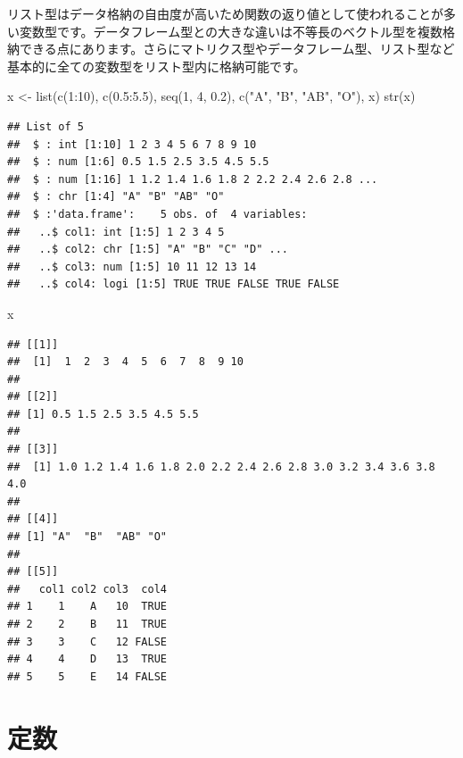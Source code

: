 \documentclass[
  12pt,
]{book}
\newenvironment{Shaded}{\begin{snugshade}}{\end{snugshade}}
\newcommand{\DecValTok}[1]{\textcolor[rgb]{0.00,0.00,0.81}{#1}}
\newcommand{\FloatTok}[1]{\textcolor[rgb]{0.00,0.00,0.81}{#1}}
\newcommand{\FunctionTok}[1]{\textcolor[rgb]{0.00,0.00,0.00}{#1}}
\newcommand{\NormalTok}[1]{#1}
\newcommand{\OtherTok}[1]{\textcolor[rgb]{0.56,0.35,0.01}{#1}}
\newcommand{\SpecialCharTok}[1]{\textcolor[rgb]{0.00,0.00,0.00}{#1}}
\newcommand{\StringTok}[1]{\textcolor[rgb]{0.31,0.60,0.02}{#1}}
\begin{document}
リスト型はデータ格納の自由度が高いため関数の返り値として使われることが多い変数型です。データフレーム型との大きな違いは不等長のベクトル型を複数格納できる点にあります。さらにマトリクス型やデータフレーム型、リスト型など基本的に全ての変数型をリスト型内に格納可能です。

\begin{Shaded}
\begin{Highlighting}[]
\NormalTok{x }\OtherTok{\textless{}{-}} \FunctionTok{list}\NormalTok{(}\FunctionTok{c}\NormalTok{(}\DecValTok{1}\SpecialCharTok{:}\DecValTok{10}\NormalTok{), }\FunctionTok{c}\NormalTok{(}\FloatTok{0.5}\SpecialCharTok{:}\FloatTok{5.5}\NormalTok{), }\FunctionTok{seq}\NormalTok{(}\DecValTok{1}\NormalTok{, }\DecValTok{4}\NormalTok{, }\FloatTok{0.2}\NormalTok{), }\FunctionTok{c}\NormalTok{(}\StringTok{"A"}\NormalTok{, }\StringTok{"B"}\NormalTok{, }\StringTok{"AB"}\NormalTok{, }\StringTok{"O"}\NormalTok{), x)}
\FunctionTok{str}\NormalTok{(x)}
\end{Highlighting}
\end{Shaded}

\begin{verbatim}
## List of 5
##  $ : int [1:10] 1 2 3 4 5 6 7 8 9 10
##  $ : num [1:6] 0.5 1.5 2.5 3.5 4.5 5.5
##  $ : num [1:16] 1 1.2 1.4 1.6 1.8 2 2.2 2.4 2.6 2.8 ...
##  $ : chr [1:4] "A" "B" "AB" "O"
##  $ :'data.frame':    5 obs. of  4 variables:
##   ..$ col1: int [1:5] 1 2 3 4 5
##   ..$ col2: chr [1:5] "A" "B" "C" "D" ...
##   ..$ col3: num [1:5] 10 11 12 13 14
##   ..$ col4: logi [1:5] TRUE TRUE FALSE TRUE FALSE
\end{verbatim}

\begin{Shaded}
\begin{Highlighting}[]
\NormalTok{x}
\end{Highlighting}
\end{Shaded}

\begin{verbatim}
## [[1]]
##  [1]  1  2  3  4  5  6  7  8  9 10
## 
## [[2]]
## [1] 0.5 1.5 2.5 3.5 4.5 5.5
## 
## [[3]]
##  [1] 1.0 1.2 1.4 1.6 1.8 2.0 2.2 2.4 2.6 2.8 3.0 3.2 3.4 3.6 3.8 4.0
## 
## [[4]]
## [1] "A"  "B"  "AB" "O" 
## 
## [[5]]
##   col1 col2 col3  col4
## 1    1    A   10  TRUE
## 2    2    B   11  TRUE
## 3    3    C   12 FALSE
## 4    4    D   13  TRUE
## 5    5    E   14 FALSE
\end{verbatim}

\hypertarget{ux5b9aux6570}{%
\section{定数}\label{ux5b9aux6570}}
\end{document}
